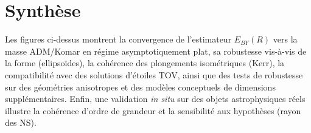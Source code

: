 \documentclass[11pt,a4paper]{article}
\begin{document}
\medskip

\section{Synthèse}
Les figures ci-dessus montrent la convergence de l'estimateur $E_{BY}(R)$ vers la masse ADM/Komar
en régime asymptotiquement plat, sa robustesse vis-à-vis de la forme (ellipsoïdes), la cohérence des
plongements isométriques (Kerr), la compatibilité avec des solutions d'étoiles TOV, ainsi que des tests
de robustesse sur des géométries anisotropes et des modèles conceptuels de dimensions supplémentaires.
Enfin, une validation \emph{in situ} sur des objets astrophysiques réels illustre la cohérence d'ordre
de grandeur et la sensibilité aux hypothèses (rayon des NS).
\end{document}
